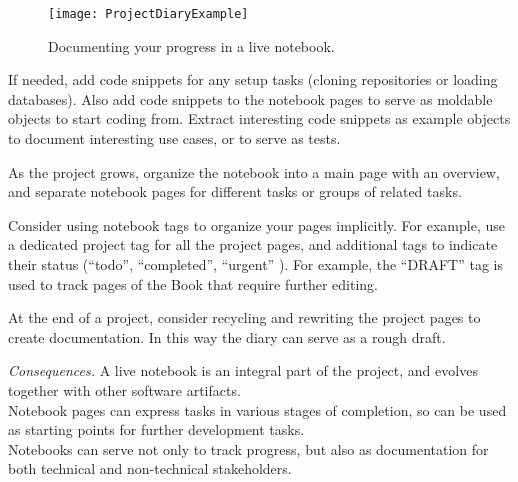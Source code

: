 \documentclass[acmsmall,screen,authorversion,nonacm]{acmart} %
\newcommand\kh[1]{\nbc{Konrad}{#1}{violet}}
\newcommand\cp[1]{\nbe{Cesare}{#1}{olive}} %
\newcommand{\GT}{\lst{GT}\xspace} %
\newcommand{\patsec}[1]{\noindent\textit{#1.}\xspace}
\begin{document}
\begin{figure}[h]
  \texttt{[image: ProjectDiaryExample]}
  \caption{Documenting your progress in a live notebook.}
  \label{fig:ProjectDiary}
\end{figure}

If needed, add code snippets for any setup tasks (\eg cloning repositories or loading databases).
Also add code snippets to the notebook pages to serve as moldable objects to start coding from.
Extract interesting code snippets as example objects to document interesting use cases, or to serve as tests.

As the project grows, organize the notebook into a main page with an overview, and separate notebook pages for different tasks or groups of related tasks.

Consider using notebook tags 
to organize your pages implicitly. For example, use a dedicated project tag for all the project pages, and additional tags to indicate their status (``todo'', ``completed'', ``urgent'' \etc).
For example, the ``DRAFT'' tag is used to track pages of the \GT Book that require further editing.

At the end of a project, consider recycling and rewriting the project pages to create documentation. In this way the diary can serve as a rough draft.


\patsec{Consequences}
A live notebook is an integral part of the project, and evolves together with other software artifacts.\\
Notebook pages can express tasks in various stages of completion, so can be used as starting points for further development tasks.\\
Notebooks can serve not only to track progress, but also as documentation for both technical and non-technical stakeholders.
\end{document}
